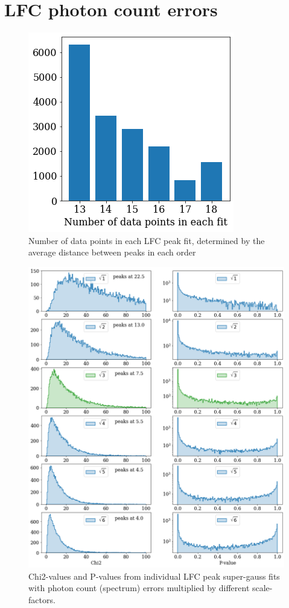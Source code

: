 
\section{LFC photon count errors}\label{appendix:LFC_errors}

\begin{figure}[ht]
    \centering
    \includegraphics[scale=0.50]{figures/N_data_points.png}
    \caption{Number of data points in each LFC peak fit, determined by the average distance between peaks in each order}
    \label{fig:N_data_points}
\end{figure}

\begin{figure}[ht]
    \centering
    \includegraphics[scale=0.50]{figures/calib_errors_extensive.png}
    \caption{Chi2-values and P-values from individual LFC peak super-gauss fits with photon count (spectrum) errors multiplied by different scale-factors.}
    \label{fig:calib_errors_extensive}
\end{figure}

